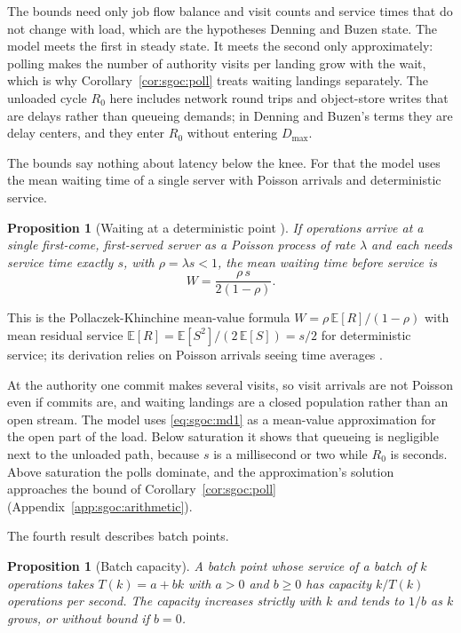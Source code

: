 \documentclass[11pt,letterpaper]{article}
\newtheorem{proposition}[theorem]{Proposition}
\theoremstyle{definition}
\theoremstyle{remark}
\begin{document}
The bounds need only job flow balance and visit counts and service times that do not change with load, which are the hypotheses Denning and Buzen state. The model meets the first in steady state. It meets the second only approximately: polling makes the number of authority visits per landing grow with the wait, which is why Corollary~\ref{cor:sgoc:poll} treats waiting landings separately. The unloaded cycle $R_0$ here includes network round trips and object-store writes that are delays rather than queueing demands; in Denning and Buzen's terms they are delay centers, and they enter $R_0$ without entering $D_{\max}$.

The bounds say nothing about latency below the knee. For that the model uses the mean waiting time of a single server with Poisson arrivals and deterministic service.

\begin{proposition}[Waiting at a deterministic point {\cite[Sections~7.6 and 7.7]{adan2015queueing}}]
\label{prop:sgoc:md1}
If operations arrive at a single first-come, first-served server as a Poisson process of rate $\lambda$ and each needs service time exactly $s$, with $\rho = \lambda s < 1$, the mean waiting time before service is
\begin{equation}
\label{eq:sgoc:md1}
W = \frac{\rho\, s}{2(1-\rho)}.
\end{equation}
\end{proposition}

This is the Pollaczek-Khinchine mean-value formula $W = \rho\,\mathbb{E}[R]/(1-\rho)$ with mean residual service $\mathbb{E}[R] = \mathbb{E}[S^2]/(2\,\mathbb{E}[S]) = s/2$ for deterministic service; its derivation relies on Poisson arrivals seeing time averages \cite{adan2015queueing}.

At the authority one commit makes several visits, so visit arrivals are not Poisson even if commits are, and waiting landings are a closed population rather than an open stream. The model uses \cref{eq:sgoc:md1} as a mean-value approximation for the open part of the load. Below saturation it shows that queueing is negligible next to the unloaded path, because $s$ is a millisecond or two while $R_0$ is seconds. Above saturation the polls dominate, and the approximation's solution approaches the bound of Corollary~\ref{cor:sgoc:poll} (Appendix~\ref{app:sgoc:arithmetic}).

The fourth result describes batch points.

\begin{proposition}[Batch capacity]
\label{prop:sgoc:batch}
A batch point whose service of a batch of $k$ operations takes $T(k) = a + bk$ with $a > 0$ and $b \ge 0$ has capacity $k/T(k)$ operations per second. The capacity increases strictly with $k$ and tends to $1/b$ as $k$ grows, or without bound if $b = 0$.
\end{proposition}
\end{document}
